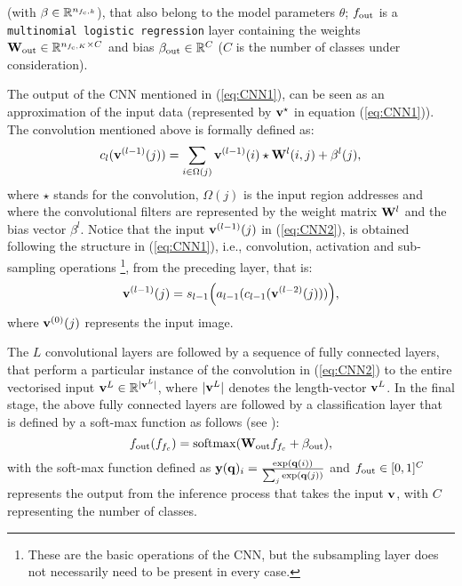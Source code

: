\documentclass[5p,time]{elsarticle}
\begin{document}
(with $\beta\in\mathbb{R}^{n_{f_{\rm c},k}}$), that also belong to the model parameters $\theta$; $f_{\rm out}$ is a \texttt{multinomial logistic regression} layer containing the weights ${\bf W}_{\rm out}\in\mathbb{R}^{n_{{f_{\rm c}},K}\times C}$ and bias $\beta_{\rm out}\in\mathbb{R}^{C}$ ($C$ is the number of classes under consideration).

The output of the CNN mentioned in (\ref{eq:CNN1}), can be seen as an approximation of the input data (represented by
${\bf v}^{\star}$ in equation (\ref{eq:CNN1})). The convolution mentioned above is formally defined as:
\begin{equation}
c_{l}({\bf v}^{(l-1)}(j)) = \sum_{i\in\Omega(j)} {\bf v}^{(l-1)}(i) \star {\bf W}^{l}(i,j) + \beta^{l}(j),\label{eq:CNN2}
\end{equation}
where $\star$ stands for the convolution, $\Omega(j)$ is the input region addresses and where the convolutional filters are represented by the weight matrix ${\bf W}^l$ and the bias vector $\beta^l$.
Notice that the input ${\bf v}^{(l-1)}(j)$ in (\ref{eq:CNN2}), is obtained following the structure in (\ref{eq:CNN1}), i.e., convolution, activation and sub-sampling operations \footnote{These are the basic operations of the CNN, but the subsampling layer does not necessarily need to be present in every case.}, from the preceding layer, that is:
\begin{equation}{\bf v}^{(l-1)}(j) = s_{l-1}\Bigl(a_{l-1}(c_{l-1}({\bf v}^{(l-2)}(j) ))\Bigr),
\end{equation}
where ${\bf v}^{(0)}(j)$  represents the input image.

The $L$ convolutional layers are followed by a sequence of fully
connected layers, that perform a particular instance of the
convolution in (\ref{eq:CNN2}) to the entire vectorised input ${\bf
	v}^L\in\mathbb{R}^{|{\bf v}^L|}$, where $|{\bf v}^L|$ denotes the
length-vector ${\bf v}^L$. In the final stage, the above fully
connected layers are followed by a classification layer that is
defined by a soft-max function as follows (see
\cite{KrizhevskyNIPS2012}):
\begin{equation}
f_{\rm out}(f_{{f_c}}) = {\rm softmax}({\bf W}_{\rm out} f_{{f_c}} + \beta_{\rm out}), \label{eq:out}
\end{equation}
with the soft-max function defined as  ${\bf y}({\bf
	q})_i=\frac{\exp({{\bf q}}(i))}{\sum_j \exp({{\bf q}}(j))}$ and
$f_{\rm out}\in[0,1]^C$ represents the output from the inference
process that takes the input ${\bf v}$, with $C$ representing the
number of classes.
\end{document}
